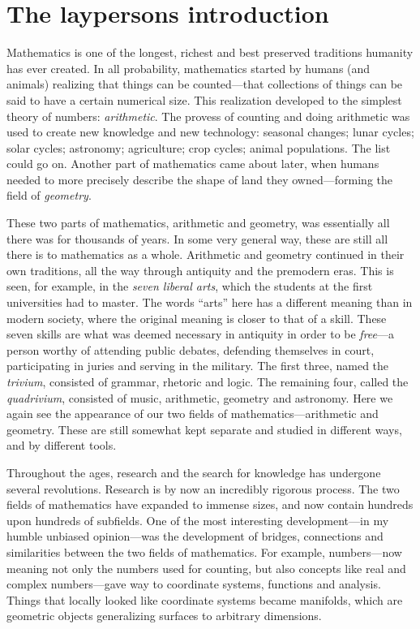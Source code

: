 
\section{The laypersons introduction}

Mathematics is one of the longest, richest and best preserved traditions humanity has ever created. In all probability, mathematics started by humans (and animals) realizing that things can be counted---that collections of things can be said to have a certain numerical size. This realization developed to the simplest theory of numbers: \emph{arithmetic}. The provess of counting and doing arithmetic was used to create new knowledge and new technology: seasonal changes; lunar cycles; solar cycles; astronomy; agriculture; crop cycles; animal populations. The list could go on. Another part of mathematics came about later, when humans needed to more precisely describe the shape of land they owned---forming the field of \emph{geometry}. 

These two parts of mathematics, arithmetic and geometry, was essentially all there was for thousands of years. In some very general way, these are still all there is to mathematics as a whole. Arithmetic and geometry continued in their own traditions, all the way through antiquity and the premodern eras. This is seen, for example, in the \emph{seven liberal arts}, which the students at the first universities had to master. The words ``arts'' here has a different meaning than in modern society, where the original meaning is closer to that of a skill. These seven skills are what was deemed necessary in antiquity in order to be \emph{free}---a person worthy of attending public debates, defending themselves in court, participating in juries and serving in the military. The first three, named the \emph{trivium}, consisted of grammar, rhetoric and logic. The remaining four, called the \emph{quadrivium}, consisted of music, arithmetic, geometry and astronomy. Here we again see the appearance of our two fields of mathematics---arithmetic and geometry. These are still somewhat kept separate and studied in different ways, and by different tools. 

Throughout the ages, research and the search for knowledge has undergone several revolutions. Research is by now an incredibly rigorous process. The two fields of mathematics have expanded to immense sizes, and now contain hundreds upon hundreds of subfields. One of the most interesting development---in my humble unbiased opinion---was the development of bridges, connections and similarities between the two fields of mathematics. For example, numbers---now meaning not only the numbers used for counting, but also concepts like real and complex numbers---gave way to coordinate systems, functions and analysis. Things that locally looked like coordinate systems became manifolds, which are geometric objects generalizing surfaces to arbitrary dimensions. 

